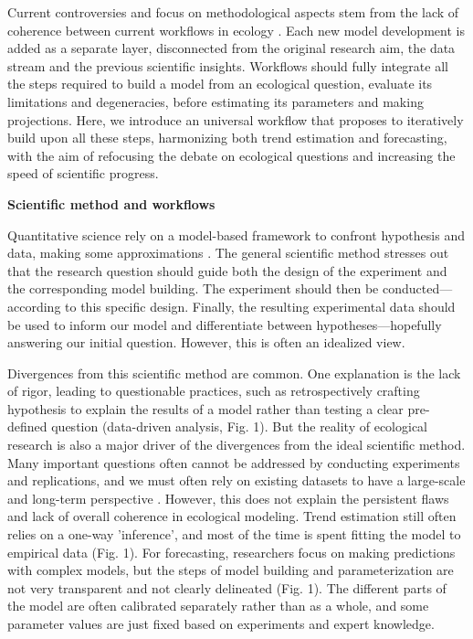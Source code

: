 \documentclass[11pt]{article}
\begin{document}
Current controversies and focus on methodological aspects stem from the lack of coherence between current workflows in ecology \citep{Loreau2022, Talis2023, Johnson2024}. Each new model development is added as a separate layer, disconnected from the original research aim, the data stream and the previous scientific insights. Workflows should fully integrate all the steps required to build a model from an ecological question, evaluate its limitations and degeneracies, before estimating its parameters and making projections. Here, we introduce an universal workflow that proposes to iteratively build upon all these steps, harmonizing both trend estimation and forecasting, with the aim of refocusing the debate on ecological questions and increasing the speed of scientific progress.

\vspace{0.5cm}
\noindent \textbf{Scientific method and workflows}

Quantitative science rely on a model-based framework to confront hypothesis and data, making some approximations \citep{}. The general scientific method stresses out that the research question should guide both the design of the experiment and the corresponding model building. The experiment should then be conducted---according to this specific design. Finally, the resulting experimental data should be used to inform our model and differentiate between hypotheses---hopefully answering our initial question. However, this is often an idealized view.

Divergences from this scientific method are common. One explanation is the lack of rigor, leading to questionable practices, such as retrospectively crafting hypothesis to explain the results of a model rather than testing a clear pre-defined question (data-driven analysis, Fig. 1). But the reality of ecological research is also a major driver of the divergences from the ideal scientific method. Many important questions often cannot be addressed by conducting experiments and replications, and we must often rely on existing datasets to have a large-scale and long-term perspective \citep{Hilborn1997}. %
However, this does not explain the persistent flaws and lack of overall coherence in ecological modeling. Trend estimation still often relies on a one-way 'inference',  %
and most of the time is spent fitting the model to empirical data (Fig. 1). For forecasting, researchers focus on making predictions with complex models, but the steps of model building and parameterization are not very transparent and not clearly delineated (Fig. 1). The different parts of the model are often calibrated separately rather than as a whole, and some parameter values are just fixed based on experiments and expert knowledge.
\end{document}
